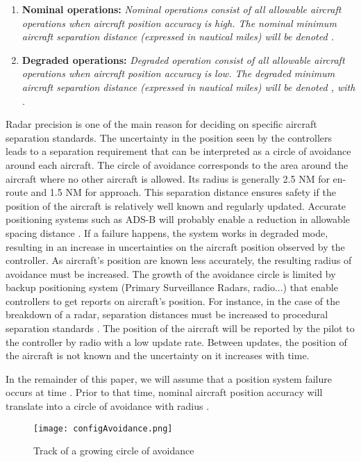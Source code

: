 \documentclass[a4paper, 10pt]{IEEEtran}
\begin{document}
\begin{enumerate}
\item {\bf Nominal operations:} \emph{ Nominal operations consist of all allowable aircraft operations when
aircraft position accuracy is high. The nominal minimum aircraft separation distance (expressed in nautical miles) will be denoted  .}
\item {\bf Degraded operations:} \emph{Degraded operation consist of all allowable aircraft operations when aircraft position accuracy is low. The degraded minimum aircraft separation distance (expressed in nautical miles) will be denoted , with . }
\end{enumerate}

Radar precision is one of the main reason for deciding on specific aircraft separation standards. The uncertainty in the position seen by the controllers leads to a separation requirement that can be interpreted as a circle of avoidance around each aircraft. The circle of avoidance corresponds to the area around the aircraft where no other aircraft is allowed. Its radius is generally 2.5 NM for en-route and 1.5 NM for approach. This separation distance ensures safety if the position of the aircraft is relatively well known and regularly updated. Accurate positioning systems such as ADS-B will probably enable a reduction in allowable spacing distance \cite{powell2005}. If a failure happens, the system works in degraded mode, resulting in an increase in uncertainties on the aircraft position observed by the controller. As aircraft's position are known less accurately, the resulting radius of avoidance must be increased. The growth of the avoidance circle is limited by backup positioning system (Primary Surveillance Radars, radio...) that enable controllers to get reports on aircraft's position.  For instance, in the case of the breakdown of a radar, separation distances must be increased to procedural separation standards \cite{ICAO4444}. The position of the aircraft will be reported by the pilot to the controller by radio with a low update rate. Between updates, the position of the aircraft is not known and the uncertainty on it increases with time. 

In the remainder of this paper, we will assume that a position system failure occurs at time . Prior to that time, nominal aircraft position accuracy will translate into a circle of avoidance with radius
.  

\begin{figure}[ht]
\centering
 \texttt{[image: configAvoidance.png]}
\caption{Track of a growing circle of avoidance}\label{fig:configavoidance}
\end{figure}
\end{document}
